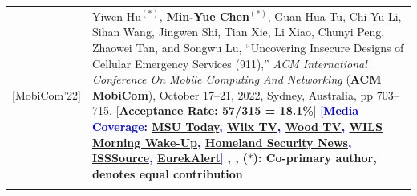 \begin{longtable}{p{1mm}p{14.5cm}}
\hspace{-23 mm} [MobiCom'22] 	&	
Yiwen Hu$^{(\ast)}$, \textbf{Min-Yue Chen$^{(\ast)}$}, Guan-Hua Tu, Chi-Yu Li, Sihan Wang, Jingwen Shi, Tian Xie, Li Xiao, Chunyi Peng, Zhaowei Tan, and Songwu Lu,
``Uncovering Insecure Designs of Cellular Emergency Services (911),''
\emph{ACM International Conference On Mobile Computing And Networking} (\textbf{ACM MobiCom}), October 17–21, 2022, Sydney, Australia, pp 703–715.
[\textbf{Acceptance Rate: 57/315 = 18.1\%}]
\textcolor{Blue}{[\textbf{Media Coverage: \href{https://msutoday.msu.edu/news/2023/making-emergency-calls-more-secure}{MSU Today}, \href{https://www.wilx.com/2023/04/25/msu-researchers-discover-vulnerability-911-calls-made-cell-phones/}{Wilx TV}, \href{https://www.woodtv.com/video/msu-researchers-get-1-2m-to-improve-911-call-security/8598883/}{Wood TV}, \href{https://player.fm/series/the-wils-morning-wake-up/guan-hua-tu-jillian-tang}{WILS Morning Wake-Up}, \href{https://www.homelandsecuritynewswire.com/dr20230427-making-emergency-calls-more-secure}{Homeland Security News}, \href{https://www.isssource.com/boosting-security-for-cellular-emergency-calls/}{ISSSource}, \href{https://www.eurekalert.org/news-releases/987600}{EurekAlert}}]}
\textbf{\href{https://www.cse.msu.edu/~ghtu/911-award.png}{\color{Red}{Best Community Paper Award - Runner Up}}, \textbf{\href{https://www.sigmobile.org/grav/publications/research-highlights}{\color{Red}{ACM SIGMOBILE Research Highlights}}}, {\color{Red}{AT\&T Security Award}}} \newline\textbf{($\ast$): Co-primary author, denotes equal contribution}\\

\\



\end{longtable}





